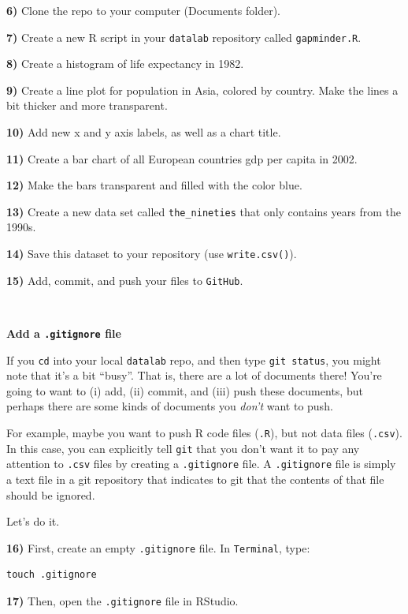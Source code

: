 \documentclass[]{book}
\begin{document}
\textbf{6)} Clone the repo to your computer (Documents folder).

\textbf{7)} Create a new R script in your \texttt{datalab} repository called \texttt{gapminder.R}.

\textbf{8)} Create a histogram of life expectancy in 1982.

\textbf{9)} Create a line plot for population in Asia, colored by country. Make the lines a bit thicker and more transparent.

\textbf{10)} Add new x and y axis labels, as well as a chart title.

\textbf{11)} Create a bar chart of all European countries gdp per capita in 2002.

\textbf{12)} Make the bars transparent and filled with the color blue.

\textbf{13)} Create a new data set called \texttt{the\_nineties} that only contains years from the 1990s.

\textbf{14)} Save this dataset to your repository (use \texttt{write.csv()}).

\textbf{15)} Add, commit, and push your files to \texttt{GitHub}.

~

\textbf{Add a \texttt{.gitignore} file}

If you \texttt{cd} into your local \texttt{datalab} repo, and then type \texttt{git\ status}, you might note that it's a bit ``busy''. That is, there are a lot of documents there! You're going to want to (i) add, (ii) commit, and (iii) push these documents, but perhaps there are some kinds of documents you \emph{don't} want to push.

For example, maybe you want to push R code files (\texttt{.R}), but not data files (\texttt{.csv}). In this case, you can explicitly tell \texttt{git} that you don't want it to pay any attention to \texttt{.csv} files by creating a \texttt{.gitignore} file. A \texttt{.gitignore} file is simply a text file in a git repository that indicates to git that the contents of that file should be ignored.

Let's do it.

\textbf{16)} First, create an empty \texttt{.gitignore} file. In \texttt{Terminal}, type:

\begin{verbatim}
touch .gitignore
\end{verbatim}

\textbf{17)} Then, open the \texttt{.gitignore} file in RStudio.
\end{document}
